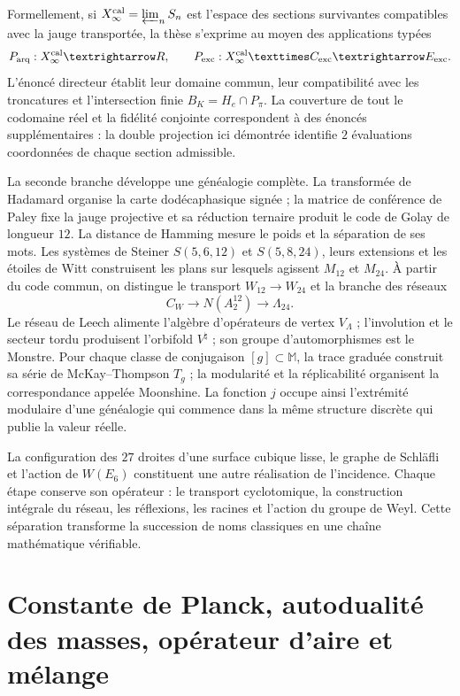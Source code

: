 Formellement, si 
\(\mathcal X_\infty^{\rm cal}=\varprojlim_n\mathcal S_n\) est l'espace des
sections survivantes compatibles avec la jauge transportée, la thèse
s'exprime au moyen des applications typées
\[
 \mathcal P_{\rm arq}:\mathcal X_\infty^{\rm cal}\longrightarrow\mathbb R,
 \qquad
 \mathcal P_{\rm exc}:\mathcal X_\infty^{\rm cal}
 \times\mathcal C_{\rm exc}\longrightarrow\mathcal E_{\rm exc}.
\]
L'énoncé directeur établit leur domaine commun, leur compatibilité avec les
troncatures et l'intersection finie
\(B_K=H_e\cap P_\pi\). La couverture de tout le codomaine réel et la fidélité
conjointe correspondent à des énoncés supplémentaires : la double projection ici
démontrée identifie \(2\) évaluations coordonnées de chaque section admissible.

La seconde branche développe une généalogie complète. La transformée de
Hadamard organise la carte dodécaphasique signée ; la matrice de conférence de
Paley fixe la jauge projective et sa réduction ternaire produit le code
de Golay de longueur \(12\). La distance de Hamming mesure le poids et la
séparation de ses mots. Les systèmes de Steiner
\(S(5,6,12)\) et \(S(5,8,24)\), leurs extensions et les étoiles de Witt
construisent les plans sur lesquels agissent \(M_{12}\) et \(M_{24}\). À partir
du code commun, on distingue le transport \(W_{12}\to W_{24}\) et la branche
des réseaux
\[
 C_W\longrightarrow N(A_2^{12})\longrightarrow\Lambda_{24}.
\]
Le réseau de Leech alimente l'algèbre d'opérateurs de vertex
\(V_\Lambda\) ; l'involution et le secteur tordu produisent l'orbifold
\(V^\natural\) ; son groupe d'automorphismes est le Monstre. Pour chaque classe de
conjugaison \([g]\subset\mathbb M\), la trace graduée construit sa série de
McKay--Thompson \(T_g\) ; la modularité et la réplicabilité organisent la
correspondance appelée Moonshine. La fonction \(j\) occupe ainsi l'extrémité
modulaire d'une généalogie qui commence dans la même structure discrète qui
publie la valeur réelle.

La configuration des \(27\) droites d'une surface cubique lisse,
le graphe de Schläfli et l'action de \(W(E_6)\) constituent une autre réalisation
de l'incidence. Chaque étape conserve son opérateur : le transport cyclotomique,
la construction intégrale du réseau, les réflexions, les racines et
l'action du groupe de Weyl. Cette séparation transforme la succession de noms
classiques en une chaîne mathématique vérifiable.

\section*{Constante de Planck, autodualité des masses, opérateur d'aire et mélange}


